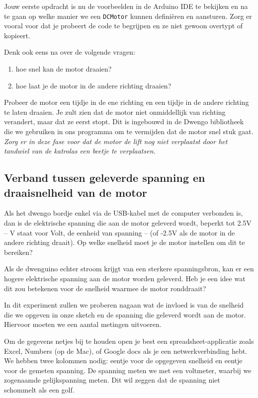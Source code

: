 \documentclass[a4paper, 10pt]{article}
\begin{document}
Jouw eerste opdracht is nu de voorbeelden in de Arduino IDE te bekijken en na te gaan op welke manier we een
\texttt{DCMotor} kunnen defini\"eren en aansturen. Zorg er vooral voor dat je probeert de code te begrijpen en ze
niet gewoon overtypt of kopieert.

Denk ook eens na over de volgende vragen:

\begin{enumerate}
\item hoe snel kan de motor draaien?
\item hoe laat je de motor in de andere richting draaien?
\end{enumerate}

Probeer de motor een tijdje in de ene richting en een tijdje in de andere richting te laten draaien. Je zult zien dat
de motor niet onmiddellijk van richting verandert, maar dat ze eerst stopt. Dit is ingebouwd in de Dwengo bibliotheek
die we gebruiken in ons programma om te vermijden dat de motor snel stuk gaat. {\em Zorg er in deze fase voor dat de motor de
lift nog niet verplaatst door het tandwiel van de katrolas een beetje te verplaatsen.}

\subsection{Verband tussen geleverde spanning en draaisnelheid van de motor}

Als het dwengo bordje enkel via de USB-kabel met de computer verbonden is, dan is de elektrische spanning die aan de motor
geleverd wordt, beperkt tot 2.5V -- V staat voor Volt, de eenheid van spanning -- (of -2.5V als de motor in de andere
richting draait). Op welke snelheid moet je de motor instellen om dit te bereiken?

Als de dwenguino echter stroom krijgt van een sterkere spanningsbron, kan er een hogere elektrische spanning aan de
motor worden geleverd. Heb je een idee wat dit zou betekenen voor de snelheid waarmee de motor ronddraait?

In dit experiment zullen we proberen nagaan wat de invloed is van de snelheid die we opgeven in onze sketch en de spanning
die geleverd wordt aan de motor. Hiervoor moeten we een aantal metingen uitvoeren.

Om de gegevens netjes bij te houden open je best een spreadsheet-applicatie zoals Excel, Numbers (op de Mac), of Google
docs als je een netwerkverbinding hebt. We hebben twee kolommen nodig: eentje voor de opgegeven snelheid en eentje voor
de gemeten spanning. De spanning meten we met een voltmeter, waarbij we zogenaamde gelijkspanning meten. Dit wil zeggen
dat de spanning niet schommelt als een golf.
\end{document}
